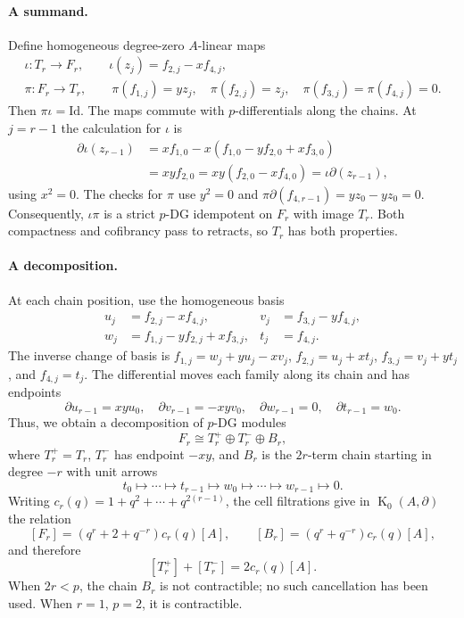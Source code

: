 \documentclass[11pt]{article}
\theoremstyle{definition}
\numberwithin{equation}{section}
\def\Id{\mathrm{Id}}
\newcommand{\K}{\operatorname{K}_0}
\begin{document}
\paragraph{A summand.}
Define homogeneous degree-zero $A$-linear maps
\begin{equation}\label{eq:gap-retract}
\begin{gathered}
 \iota:T_r\longrightarrow F_r,\qquad \iota(z_j)=f_{2,j}-xf_{4,j},\\
 \pi:F_r\longrightarrow T_r,\qquad
 \pi(f_{1,j})=yz_j,\quad \pi(f_{2,j})=z_j,\quad
 \pi(f_{3,j})=\pi(f_{4,j})=0.
\end{gathered}
\end{equation}
Then $\pi \iota=\Id$.  The maps commute with $p$-differentials along the chains.
At $j=r-1$ the calculation for $\iota$ is
\[
\begin{aligned}
 \partial \iota(z_{r-1})
 &=xf_{1,0}-x(f_{1,0}-yf_{2,0}+xf_{3,0})\\
 &=xyf_{2,0}=xy(f_{2,0}-xf_{4,0})=\iota\partial(z_{r-1}),
\end{aligned}
\]
using $x^2=0$.  The checks for $\pi$ use $y^2=0$ and
$\pi\partial(f_{4,r-1})=yz_0-yz_0=0$.
Consequently, $\iota\pi$ is a strict $p$-DG idempotent on $F_r$ with image
$T_r$.  Both compactness and cofibrancy pass to retracts, so $T_r$ has
both properties.

\paragraph{A decomposition.}
At each chain position, use the homogeneous basis
\[
\begin{aligned}
 u_j&=f_{2,j}-xf_{4,j},&v_j&=f_{3,j}-yf_{4,j},\\
 w_j&=f_{1,j}-yf_{2,j}+xf_{3,j},&t_j&=f_{4,j}.
\end{aligned}
\]
The inverse change of basis is
$f_{1,j}=w_j+yu_j-xv_j$, $f_{2,j}=u_j+xt_j$,
$f_{3,j}=v_j+yt_j$, and $f_{4,j}=t_j$.
The differential moves each family along its chain and has endpoints
\[
 \partial u_{r-1}=xyu_0,\quad
 \partial v_{r-1}=-xyv_0,\quad
 \partial w_{r-1}=0,\quad \partial t_{r-1}=w_0.
\]
Thus, we obtain a decomposition of $p$-DG modules
\begin{equation}\label{eq:gap-full-split}
 F_r\cong T_r^+\oplus T_r^-\oplus B_r,
\end{equation}
where $T_r^+=T_r$, $T_r^-$ has endpoint $-xy$, and $B_r$ is the
$2r$-term chain starting in degree $-r$ with unit arrows
\[
 t_0\longmapsto\cdots\longmapsto t_{r-1}
 \longmapsto w_0\longmapsto\cdots\longmapsto w_{r-1}\longmapsto0.
\]
Writing $c_r(q)=1+q^2+\cdots+q^{2(r-1)}$, the cell filtrations give in $\K(A,\partial)$ the relation
\begin{equation}\label{eq:gap-sum-relation}
 [F_r]=(q^r+2+q^{-r})c_r(q)[A],\qquad
 [B_r]=(q^r+q^{-r})c_r(q)[A],
\end{equation}
and therefore
\begin{equation}\label{eq:gap-two-traces}
 [T_r^+]+[T_r^-]=2c_r(q)[A].
\end{equation}
When $2r<p$, the chain $B_r$ is not contractible; no such cancellation
has been used.  When $r=1$, $p=2$, it is contractible.
\end{document}
